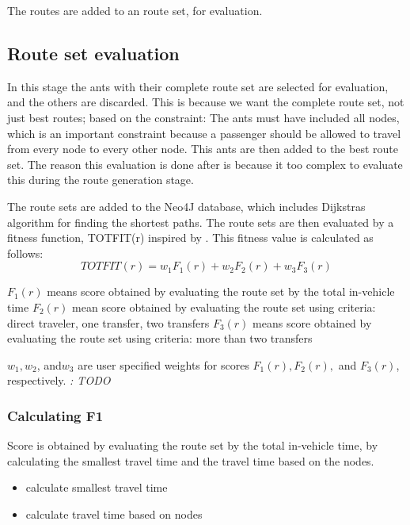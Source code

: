 The routes are added to an route set, for evaluation.


\subsection{Route set evaluation}
In this stage the ants with their complete route set are selected for evaluation, and the others are discarded. This is because we want the complete route set, not just best routes; based on the constraint: The ants must have included all nodes, which is an important constraint because a passenger should be allowed to travel from every node to every other node. 
This ants are then added to the best route set. The reason this evaluation is done after is because it too complex to evaluate this during the route generation stage. 

The route sets are added to the Neo4J database, which includes Dijkstras algorithm for finding the shortest paths. 
The route sets are then evaluated by a fitness function, TOTFIT(r) inspired by \citep{kechagiopoulos14}.
This fitness value is calculated as follows:
$$ TOTFIT(r) = w_{1}F_{1}(r) + w_{2}F_{2}(r) + w_{3}F_{3}(r)$$

$ F_{1}(r)$ means score obtained by evaluating the route set by the total in-vehicle time
$ F_{2}(r)$ mean score obtained by evaluating the route set using criteria: direct traveler, one transfer, two transfers
$ F_{3}(r)$ means score obtained by evaluating the route set using criteria: more than two transfers 

$ w_{1}, w_{2}$, and$ w_{3}$ are user specified weights for scores $ F_{1}(r), F_{2}(r),$ and $ F_{3}(r)$, respectively. \textit{: TODO}

\subsubsection{Calculating F1}
Score is obtained by evaluating the route set by the total in-vehicle time, by calculating the smallest travel time and the travel time based on the nodes.
\begin{itemize}
\item calculate smallest travel time
\item calculate travel time based on nodes
\end{itemize}


